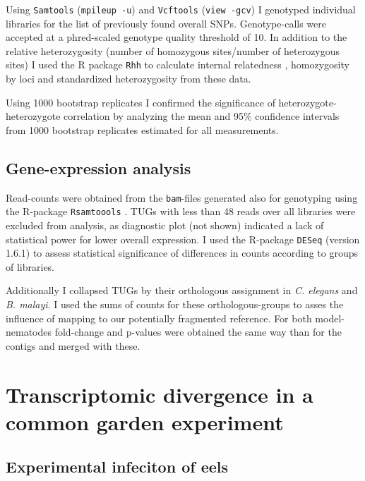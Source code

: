 Using \texttt{Samtools} \cite{journals/bioinformatics/LiHWFRHMAD09}
(\texttt{mpileup -u}) and \texttt{Vcftools} \cite{pmid21653522}
(\texttt{view -gcv}) I genotyped individual libraries for the list of
previously found overall SNPs. Genotype-calls were accepted at a
phred-scaled genotype quality threshold of 10. In addition to the
relative heterozygosity (number of homozygous sites/number of
heterozygous sites) I used the R package \texttt{Rhh}
\cite{pmid21565077} to calculate internal relatedness
\cite{pmid11571049}, homozygosity by loci \cite{pmid17107491} and
standardized heterozygosity \cite{coltman81j} from these data.

Using 1000 bootstrap replicates I confirmed the significance of
heterozygote-heterozygote correlation by analyzing the mean and 95\%
confidence intervals from 1000 bootstrap replicates estimated for all
measurements.

\subsection{Gene-expression analysis}

Read-counts were obtained from the \texttt{bam}-files generated also
for genotyping using the R-package \texttt{Rsamtoools}
\cite{rsamtools}. TUGs with less than 48 reads over all libraries were
excluded from analysis, as diagnostic plot (not shown) indicated a
lack of statistical power for lower overall expression. I used the
R-package \texttt{DESeq} \cite{pmid20979621} (version 1.6.1) to assess
statistical significance of differences in counts according to groups
of libraries.

Additionally I collapsed TUGs by their orthologous assignment in
\textit{C. elegans} and \textit{B. malayi}. I used the sums of counts
for these orthologous-groups to asses the influence of mapping to our
potentially fragmented reference. For both model-nematodes fold-change
and p-values were obtained the same way than for the contigs and
merged with these.


\section{Transcriptomic divergence in a common garden experiment}

\subsection{Experimental infeciton of eels} 

